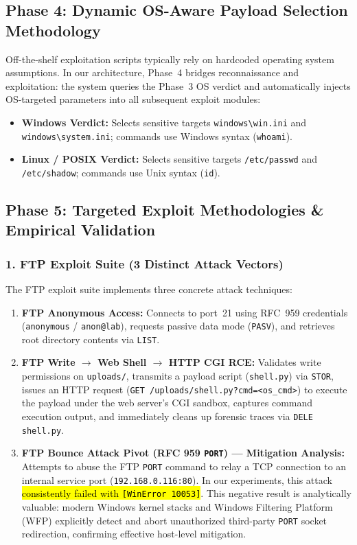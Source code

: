 \subsection{Phase 4: Dynamic OS-Aware Payload Selection Methodology}
Off-the-shelf exploitation scripts typically rely on hardcoded operating system assumptions. In our
architecture, Phase~4 bridges reconnaissance and exploitation: the system queries the Phase~3 OS
verdict and automatically injects OS-targeted parameters into all subsequent exploit modules:
\begin{itemize}
    \item \textbf{Windows Verdict:} Selects sensitive targets \texttt{windows\textbackslash win.ini}
    and \texttt{windows\textbackslash system.ini}; commands use Windows syntax (\texttt{whoami}).
    \item \textbf{Linux / POSIX Verdict:} Selects sensitive targets \texttt{/etc/passwd} and
    \texttt{/etc/shadow}; commands use Unix syntax (\texttt{id}).
\end{itemize}

\subsection{Phase 5: Targeted Exploit Methodologies \& Empirical Validation}

\subsubsection{1. FTP Exploit Suite (3 Distinct Attack Vectors)}
The FTP exploit suite implements three concrete attack techniques:
\begin{enumerate}
    \item \textbf{FTP Anonymous Access:} Connects to port~21 using RFC~959 credentials
    (\texttt{anonymous} / \texttt{anon@lab}), requests passive data mode (\texttt{PASV}), and
    retrieves root directory contents via \texttt{LIST}.
    \item \textbf{FTP Write $\rightarrow$ Web Shell $\rightarrow$ HTTP CGI RCE:} Validates write
    permissions on \texttt{uploads/}, transmits a payload script (\texttt{shell.py}) via
    \texttt{STOR}, issues an HTTP request (\texttt{GET /uploads/shell.py?cmd=<os\_cmd>}) to execute
    the payload under the web server's CGI sandbox, captures command execution output, and
    immediately cleans up forensic traces via \texttt{DELE shell.py}.
    \item \textbf{FTP Bounce Attack Pivot (RFC 959 \texttt{PORT}) — Mitigation Analysis:}
    Attempts to abuse the FTP \texttt{PORT} command to relay a TCP connection to an internal service
    port (\texttt{192.168.0.116:80}). In our experiments, this attack \hl{consistently failed with
    \texttt{[WinError 10053]}}. This negative result is analytically valuable: modern Windows kernel
    stacks and Windows Filtering Platform (WFP) explicitly detect and abort unauthorized
    third-party \texttt{PORT} socket redirection, confirming effective host-level mitigation.
\end{enumerate}

